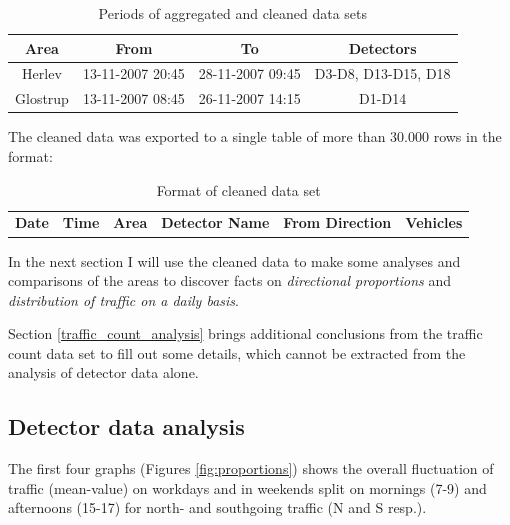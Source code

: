\begin{table}[!ht]
\centering
\begin{tabular}{c|c|c|c}
\textbf{Area} & \textbf{From} & \textbf{To} & \textbf{Detectors} \\ \hline
Herlev & 13-11-2007 20:45 & 28-11-2007 09:45 & D3-D8, D13-D15, D18 \\
Glostrup & 13-11-2007 08:45 & 26-11-2007 14:15 & D1-D14 \\
\end{tabular}
\caption{Periods of aggregated and cleaned data sets}
\label{tab:dataperiod}
\end{table}

The cleaned data was exported to a single table of more than 30.000 rows in the format:
\begin{table}[!ht]
\centering
\begin{tabular}{c|c|c|c|c|c}
\textbf{Date} & \textbf{Time} & \textbf{Area} & \textbf{Detector Name} & \textbf{From Direction} & \textbf{Vehicles} \\
\end{tabular}
\caption{Format of cleaned data set}
\label{tab:cleandataformat}
\end{table}

In the next section I will use the cleaned data to make some analyses and comparisons of the areas to discover facts on \textit{directional proportions} and \textit{distribution of traffic on a daily basis}.

Section \ref{traffic_count_analysis} brings additional conclusions from the traffic count data set to fill out some details, which cannot be extracted from the analysis of detector data alone.

\subsection{Detector data analysis}
\label{detector_data}
The first four graphs (Figures \ref{fig:proportions}) shows the overall fluctuation of traffic (mean-value) on workdays and in weekends split on mornings (7-9) and afternoons (15-17) for north- and southgoing traffic (N and S resp.).

